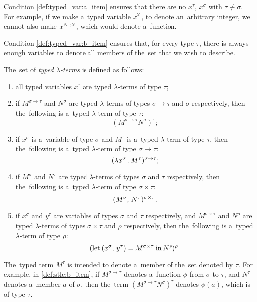 Condition \ref{def:typed_var:a_item} ensures that there are no $x^\tau$,
$x^\sigma$ with $\tau \not\equiv \sigma$. For example, if we make a~typed
variable $x^{\mathbb{Z}}$, to denote an~arbitrary integer, we cannot also make
$x^{\mathbb{Z} \to \mathbb{Z}}$, which would denote a~function.

Condition \ref{def:typed_var:b_item} ensures that, for every type $\tau$, there
is always enough variables to denote all members of the~set that we wish to
describe.

\begin{definition}\label{def:stlc}
  The~set of \emph{typed $\lambda$-terms} is defined as follows:
  \begin{enumerate}
    \item all typed variables $x^\tau$ are typed $\lambda$-terms of type $\tau$;
    \item \label{def:stlc:b_item} if $M^{\sigma \to \tau}$ and $N^\sigma$ are
      typed $\lambda$-terms of types $\sigma \to \tau$ and $\sigma$
      respectively, then the~following is a~typed $\lambda$-term of type $\tau$:
      \[
        (M^{\sigma \to \tau} N^\sigma)^\tau;
      \]
    \item if $x^\sigma$ is a~variable of type $\sigma$ and $M^\tau$ is a~typed
      $\lambda$-term of type $\tau$, then the~following is a~typed
      $\lambda$-term of type $\sigma \to \tau$:
      \[
        (\lambda x^\sigma \, . \: M^\tau)^{\sigma \to \tau};
      \]
    \item \label{def:stlc:d_item} if $M^\sigma$ and $N^\tau$ are typed
      $\lambda$-terms of types $\sigma$ and $\tau$ respectively, then
      the~following is a~typed $\lambda$-term of type $\sigma \times \tau$:
      \[
        (M^\sigma, \, N^\tau) ^{\sigma \times \tau};
      \]
    \setcounter{stlc_counter}{\value{enumi}}
    \item \label{def:stlc:e_item} if $x^\sigma$ and $y^\tau$ are variables of
      types $\sigma$ and $\tau$ respectively, and $M^{\sigma \times \tau}$ and
      $N^\rho$ are typed $\lambda$-terms of types $\sigma \times \tau$ and
      $\rho$ respectively, then the~following is a~typed $\lambda$-term of type
      $\rho$:
      \[
        (\textrm{let} \: (x^\sigma, \, y^\tau) = M^{\sigma \times \tau} \:
        \textrm{in} \: N^{\rho})^\rho.
      \]
\end{enumerate}
\end{definition}

The~typed term $M^\tau$ is intended to denote a~member of the~set denoted by
$\tau$. For example, in \ref{def:stlc:b_item}, if $M^{\sigma \to \tau}$ denotes
a~function $\phi$ from $\sigma$ to $\tau$, and $N^\tau$ denotes a~member $a$ of
$\sigma$, then the~term $(M^{\sigma \to \tau} N^\sigma)^\tau$ denotes $\phi(a)$,
which is of type $\tau$.

